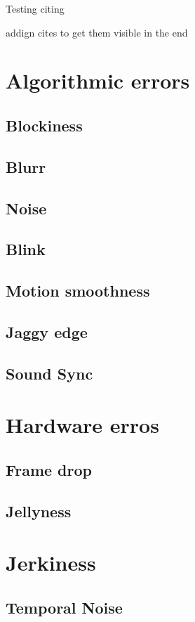 

Testing citing ~\cite{4799375}

addign cites to get them visible in the end
~\cite{5464831}
~\cite{5583037}
~\cite{5583094}
~\cite{5710601}
~\cite{5739529}
~\cite{6081486}
~\cite{6116319}
~\cite{6411890}
~\cite{6467556}
~\cite{6625056}
~\cite{6705673}
~\cite{5605523}
~\cite{5290984}
~\cite{1203346}
~\cite{4803123}
~\cite{4799318}
~\cite{5381595}
~\cite{6229729}
~\cite{4347144}
~\cite{1247211}



\section{Algorithmic errors}
\subsection{Blockiness}
\subsection{Blurr}
\subsection{Noise}
\subsection{Blink}
\subsection{Motion smoothness}
\subsection{Jaggy edge}
\subsection{Sound Sync}
\section{Hardware  erros}
\subsection{Frame drop}
\subsection{Jellyness}


\section{Jerkiness}



\subsection{Temporal Noise}




